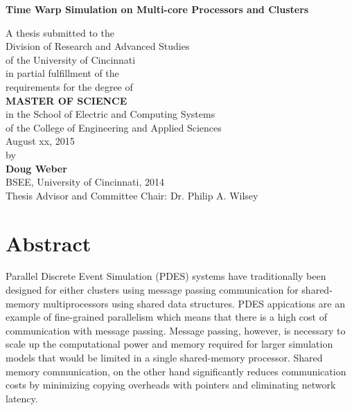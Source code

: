 \documentclass[11pt]{book}
\begin{document}
\thispagestyle{empty}

\doublespacing

\vspace*{0.5in}

\begin{center}
\LARGE{\textbf{Time Warp Simulation on Multi-core Processors and Clusters}}

\vspace*{0.4in}

  {\large A thesis submitted to the\\[0.20in]
    Division of Research and Advanced Studies\\
    of the University of Cincinnati\\[0.20in]
    in partial fulfillment of the\\
    requirements for the degree of\\[0.20in]
    \textbf{MASTER OF SCIENCE}\\[0.20in]
    in the School of Electric and Computing Systems\\
    of the College of Engineering and Applied Sciences\\[0.20in]
    August xx, 2015\\[0.20in]
    by\\[0.20in]
    \textbf{Doug Weber}\\
    BSEE, University of Cincinnati, 2014\\}
  \vspace{0.5in}
  {\large Thesis Advisor and Committee Chair:  Dr. Philip A. Wilsey}
\end{center}

\clearpage

\setcounter{page}{1}
\clearpage

\chapter*{Abstract}

Parallel Discrete Event Simulation (PDES) systems have traditionally been designed for either
clusters using message passing communication for shared-memory multiprocessors using shared
data structures. PDES appications are an example of fine-grained parallelism which means that
there is a high cost of communication with message passing. Message passing, however, is necessary
to scale up the computational power and memory required for larger simulation models that would
be limited in a single shared-memory processor. Shared memory communication, on the other hand
significantly reduces communication costs by minimizing copying overheads with pointers and
eliminating network latency.
\end{document}
